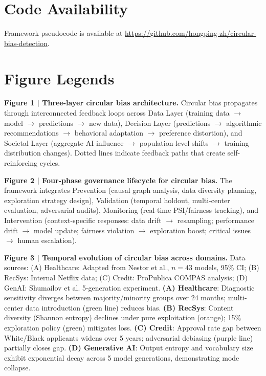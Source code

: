 \documentclass[11pt]{article}
\begin{document}
\section*{Code Availability}
Framework pseudocode is available at \url{https://github.com/hongping-zh/circular-bias-detection}.



\newpage

\section*{Figure Legends}

\textbf{Figure 1 | Three-layer circular bias architecture.} Circular bias propagates through interconnected feedback loops across Data Layer (training data $\rightarrow$ model $\rightarrow$ predictions $\rightarrow$ new data), Decision Layer (predictions $\rightarrow$ algorithmic recommendations $\rightarrow$ behavioral adaptation $\rightarrow$ preference distortion), and Societal Layer (aggregate AI influence $\rightarrow$ population-level shifts $\rightarrow$ training distribution changes). Dotted lines indicate feedback paths that create self-reinforcing cycles.

\textbf{Figure 2 | Four-phase governance lifecycle for circular bias.} The framework integrates Prevention (causal graph analysis, data diversity planning, exploration strategy design), Validation (temporal holdout, multi-center evaluation, adversarial audits), Monitoring (real-time PSI/fairness tracking), and Intervention (context-specific responses: data drift $\rightarrow$ resampling; performance drift $\rightarrow$ model update; fairness violation $\rightarrow$ exploration boost; critical issues $\rightarrow$ human escalation).

\textbf{Figure 3 | Temporal evolution of circular bias across domains.} Data sources: (A) Healthcare: Adapted from Nestor et al.\cite{nestor2024}, $n=43$ models, 95\% CI; (B) RecSys: Internal Netflix data\cite{chen2023}; (C) Credit: ProPublica COMPAS analysis\cite{obermeyer2019}; (D) GenAI: Shumailov et al.\cite{shumailov2024} 5-generation experiment. \textbf{(A) Healthcare}: Diagnostic sensitivity diverges between majority/minority groups over 24 months; multi-center data introduction (green line) reduces bias. \textbf{(B) RecSys}: Content diversity (Shannon entropy) declines under pure exploitation (orange); 15\% exploration policy (green) mitigates loss. \textbf{(C) Credit}: Approval rate gap between White/Black applicants widens over 5 years; adversarial debiasing (purple line) partially closes gap. \textbf{(D) Generative AI}: Output entropy and vocabulary size exhibit exponential decay across 5 model generations, demonstrating mode collapse.
\end{document}

